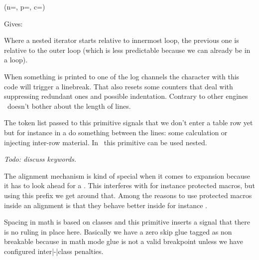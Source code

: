 \startbuffer
{} {%
     {%
        (n=\the{},
         p=\the{},
         c=\the\currentloopiterator)
    }%
}%
\stopbuffer

\typebuffer

Gives:

\getbuffer

Where a nested iterator starts relative to innermost loop, the previous one is
relative to the outer loop (which is less predictable because we can already be
in a loop).

\stopnewprimitive

\startoldprimitive[title={\prm {newlinechar}}]

When something is printed to one of the log channels the character with this code
will trigger a linebreak. That also resets some counters that deal with
suppressing redundant ones and possible indentation. Contrary to other engines
\LUAMETATEX\ doesn't bother about the length of lines.

\stopoldprimitive

\startoldprimitive[title={\prm {noalign}}]

The token list passed to this primitive signals that we don't enter a table row
yet but for instance in a  do something between the lines: some
calculation or injecting inter-row material. In \LUAMETATEX\ this primitive can
be used nested.

{\em Todo: discuss keywords.}

\stopoldprimitive

\startnewprimitive[title={\prm {noaligned}}]

The alignment mechanism is kind of special when it comes to expansion because it
has to look ahead for a . This interferes with for instance
protected macros, but using this prefix we get around that. Among the reasons to
use protected macros inside an alignment is that they behave better inside for
instance .

\stopnewprimitive

\startnewprimitive[title={\prm {noatomruling}}]

Spacing in math is based on classes and this primitive inserts a signal that
there is no ruling in place here. Basically we have a zero skip glue tagged as
non breakable because in math mode glue is not a valid breakpoint unless we have
configured inter|-|class penalties.

\stopnewprimitive

